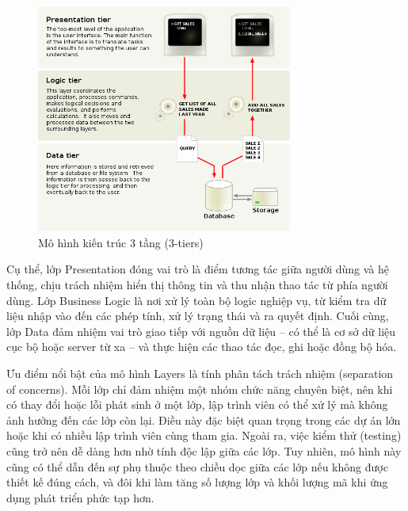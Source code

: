 \begin{figure}[H]
    \centering
    \includegraphics[width=0.75\textwidth]{images/layer.png}
    \caption{Mô hình kiến trúc 3 tầng (3-tiers)}
    \label{fig:fig11}
  \end{figure}
    
    \begin{flushleft}
        \hspace*{0.8cm}Cụ thể, lớp Presentation đóng vai trò là điểm tương tác giữa người dùng và hệ thống, chịu trách nhiệm hiển thị thông tin và thu nhận thao tác từ phía người dùng. Lớp Business Logic là nơi xử lý toàn bộ logic nghiệp vụ, từ kiểm tra dữ liệu nhập vào đến các phép tính, xử lý trạng thái và ra quyết định. Cuối cùng, lớp Data đảm nhiệm vai trò giao tiếp với nguồn dữ liệu – có thể là cơ sở dữ liệu cục bộ hoặc server từ xa – và thực hiện các thao tác đọc, ghi hoặc đồng bộ hóa.
    
    \end{flushleft}
    
    \begin{flushleft}
        \hspace*{0.8cm}Ưu điểm nổi bật của mô hình Layers là tính phân tách trách nhiệm (separation of concerns). Mỗi lớp chỉ đảm nhiệm một nhóm chức năng chuyên biệt, nên khi có thay đổi hoặc lỗi phát sinh ở một lớp, lập trình viên có thể xử lý mà không ảnh hưởng đến các lớp còn lại. Điều này đặc biệt quan trọng trong các dự án lớn hoặc khi có nhiều lập trình viên cùng tham gia. Ngoài ra, việc kiểm thử (testing) cũng trở nên dễ dàng hơn nhờ tính độc lập giữa các lớp. Tuy nhiên, mô hình này cũng có thể dẫn đến sự phụ thuộc theo chiều dọc giữa các lớp nếu không được thiết kế đúng cách, và đôi khi làm tăng số lượng lớp và khối lượng mã khi ứng dụng phát triển phức tạp hơn.
    \end{flushleft}
    
